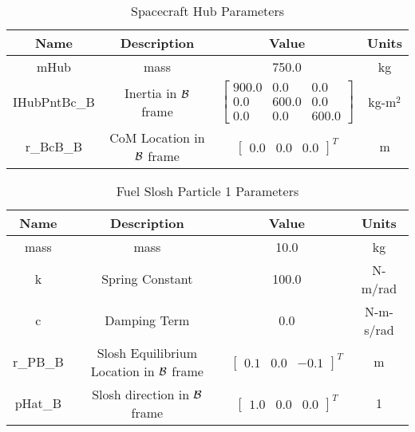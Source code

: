 \begin{table}[htbp]
	\caption{Spacecraft Hub Parameters}
	\label{tab:hub}
	\centering \fontsize{10}{10}\selectfont
	\begin{tabular}{| c | c | c | c |} %
		\hline
		\textbf{Name}  & \textbf{Description}  & \textbf{Value} & \textbf{Units} \\
		\hline
		mHub  & mass & 750.0 & kg \\
		\hline
		IHubPntBc\_B & Inertia in $\cal{B}$ frame & $\begin{bmatrix}
		900.0 & 0.0 & 0.0\\
		0.0 & 600.0 & 0.0\\
		0.0 & 0.0 & 600.0
		\end{bmatrix}$ & kg-m$^2$ \\
		\hline
		r\_BcB\_B & CoM Location in $\cal{B}$ frame & $\begin{bmatrix}
		0.0 & 0.0 & 0.0 \end{bmatrix}^T$ & m \\
		\hline
	\end{tabular}
\end{table}

\begin{table}[htbp]
	\caption{Fuel Slosh Particle 1 Parameters}
	\label{tab:slosh1}
	\centering \fontsize{10}{10}\selectfont
	\begin{tabular}{| c | c | c | c |} %
		\hline
		\textbf{Name}  & \textbf{Description}  & \textbf{Value} & \textbf{Units} \\
		\hline
		mass  & mass & 10.0 & kg \\
		\hline
		k & Spring Constant & 100.0 & N-m/rad \\
		\hline
		c & Damping Term & 0.0 & N-m-s/rad \\
		\hline
		r\_PB\_B & Slosh Equilibrium Location in $\cal{B}$ frame & $\begin{bmatrix}
		0.1 & 0.0 & -0.1 \end{bmatrix}^T$ & m \\
		\hline
		pHat\_B & Slosh direction in $\cal{B}$ frame & $\begin{bmatrix}
		1.0 & 0.0 & 0.0 \end{bmatrix}^T$ & 1 \\
		\hline
	\end{tabular}
\end{table}

